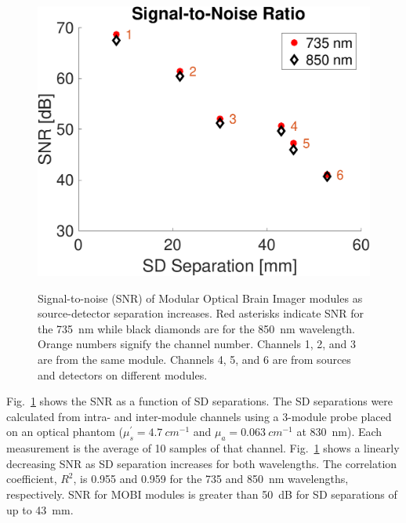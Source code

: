 \begin{figure}
	\begin{center}
	    {\includegraphics[width=.45\textwidth]{fig/mobi/snr.pdf}}
	\end{center}
	\caption{Signal-to-noise (SNR) of Modular Optical Brain Imager modules as source-detector separation increases. Red asterisks indicate SNR for the 735~nm while black diamonds are for the 850~nm wavelength. Orange numbers signify the channel number. Channels 1, 2, and 3 are from the same module. Channels 4, 5, and 6 are from sources and detectors on different modules.} 
	\label{fig:snr}
\end{figure} 
Fig.~\ref{fig:snr} shows the \ac{SNR} as a function of \ac{SD} separations. The \ac{SD} separations were calculated from intra- and inter-module channels using a 3-module probe placed on an optical phantom ($\mu_{s}^{'} = 4.7~cm^{-1}$ and $\mu_{a} = 0.063~cm^{-1}$ at 830~nm). Each measurement is the average of 10 samples of that channel. Fig.~\ref{fig:snr} shows a linearly decreasing \ac{SNR} as \ac{SD} separation increases for both wavelengths. The correlation coefficient, $R^2$, is 0.955 and 0.959 for the 735 and 850~nm wavelengths, respectively. \ac{SNR} for \ac{MOBI} modules is greater than 50~dB for \ac{SD} separations of up to 43~mm. 


